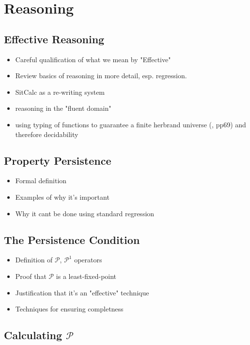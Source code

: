 \chapter{Reasoning}\label{ch:reasoning}

\section{Effective Reasoning}

\begin{itemize}
\item Careful qualification of what we mean by "Effective"
\item Review basics of reasoning in more detail, esp. regression.
\item SitCalc as a re-writing system
\item reasoning in the "fluent domain"
\item using typing of functions to guarantee a finite herbrand universe (\cite{levesque04krr_book}, pp69) and therefore decidability
\end{itemize}

\section{Property Persistence}

\begin{itemize}
\item Formal definition
\item Examples of why it's important
\item Why it cant be done using standard regression
\end{itemize}

\section{The Persistence Condition}

\begin{itemize}
\item Definition of $\mathcal{P}$, $\mathcal{P}^{1}$ operators
\item Proof that $\mathcal{P}$ is a least-fixed-point
\item Justification that it's an "effective" technique
\item Techniques for ensuring completness
\end{itemize}

\section{Calculating $\mathcal{P}$}

